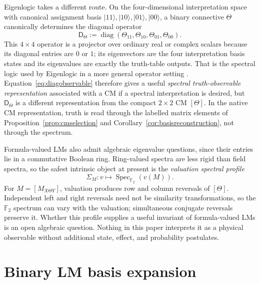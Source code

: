 \documentclass[11pt]{article}
\theoremstyle{definition}
\theoremstyle{remark}
\newcommand{\F}{\mathbb F}
\begin{document}
Eigenlogic takes a different route.  On the four-dimensional interpretation space with canonical assignment basis $|11\rangle,|10\rangle,|01\rangle,|00\rangle$, a binary connective $\Theta$ canonically determines the diagonal operator
\begin{equation}
 \mathsf D_\Theta
 :=\operatorname{diag}(\Theta_{11},\Theta_{10},\Theta_{01},\Theta_{00}).
 \label{eq:diagobservable}
\end{equation}
This $4\times4$ operator is a projector over ordinary real or complex scalars because its diagonal entries are $0$ or $1$; its eigenvectors are the four interpretation basis states and its eigenvalues are exactly the truth-table outputs.  That is the spectral logic used by Eigenlogic in a more general operator setting \cite{Toffano2020,DuboisToffano2016}.  Equation~\eqref{eq:diagobservable} therefore gives a useful \emph{spectral truth-observable representation} associated with a CM if a spectral interpretation is desired, but $\mathsf D_\Theta$ is a different representation from the compact $2\times2$ CM $[\Theta]$.  In the native CM representation, truth is read through the labelled matrix elements of Proposition~\ref{prop:cmselection} and Corollary~\ref{cor:basisreconstruction}, not through the spectrum.

Formula-valued LMs also admit algebraic eigenvalue questions, since their entries lie in a commutative Boolean ring.  Ring-valued spectra are less rigid than field spectra, so the safest intrinsic object at present is the \emph{valuation spectral profile}
\begin{equation}
 \Sigma_M:v\longmapsto\operatorname{Spec}_{\F_2}(v(M)).
 \label{eq:valspectralprofile}
\end{equation}
For $M=[M_{X\Theta Y}]$, valuation produces row and column reversals of $[\Theta]$.  Independent left and right reversals need not be similarity transformations, so the $\F_2$ spectrum can vary with the valuation; simultaneous conjugate reversals preserve it.  Whether this profile supplies a useful invariant of formula-valued LMs is an open algebraic question.  Nothing in this paper interprets it as a physical observable without additional state, effect, and probability postulates.




\section{Binary LM basis expansion}
\label{app:basis}
\end{document}

